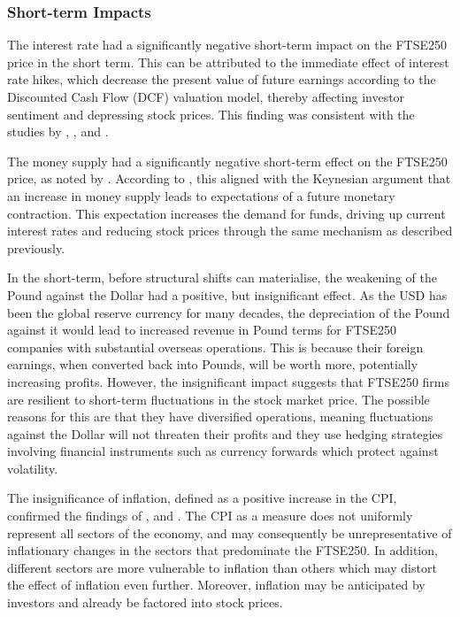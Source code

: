 \documentclass[11pt,a4paper]{article}
\newcommand{\citeboth}[1]{\citeauthor{#1} \citep{#1}}
\begin{document}
\subsubsection{Short-term Impacts}

The interest rate had a significantly
negative short-term impact on the FTSE250 price in the short term. 
This can be attributed to the immediate effect of interest rate hikes, 
which decrease the present value of future earnings according to the 
Discounted Cash Flow (DCF) valuation model, thereby 
affecting investor sentiment and depressing stock prices. 
This finding was consistent with the studies by 
\citeboth{alam2009}, \citeboth{demir2019}, and \citeboth{neifar2023}.

The money supply had a significantly negative short-term effect on the 
FTSE250 price, as noted by \citeboth{olawale2014}. 
According to \citeboth{sellin2001}, this aligned with the Keynesian argument 
that an increase in money supply leads to expectations of a future 
monetary contraction. This expectation increases the demand for 
funds, driving up current interest rates and reducing stock prices 
through the same mechanism as described previously.

In the short-term, before structural shifts can materialise, the
weakening of the Pound against the Dollar had a positive, but 
insignificant effect. As the USD has been 
the global reserve currency for many decades, the depreciation of the Pound 
against it would lead to increased revenue in Pound terms for FTSE250 
companies with substantial overseas operations. 
This is because their foreign earnings, 
when converted back into Pounds, will be worth more, 
potentially increasing profits. However, the insignificant impact suggests 
that FTSE250 firms are resilient to short-term fluctuations in the stock market 
price. The possible reasons for this are that they have diversified 
operations, meaning fluctuations against the Dollar will not threaten 
their profits and they use hedging strategies involving financial instruments 
such as currency forwards which protect against volatility. 

The insignificance of inflation, defined as a positive 
increase in the CPI, confirmed the findings of 
\citeboth{gultekin1983}, \citeboth{firth1979} and \citeboth{neifar2023}. 
The CPI as a measure does not uniformly represent all sectors of the economy, 
and may consequently be unrepresentative of inflationary changes in the 
sectors that predominate the FTSE250. In addition, different sectors 
are more vulnerable to inflation than others which may distort the effect 
of inflation even further. Moreover, inflation may be anticipated 
by investors and already be factored into stock prices.
\end{document}
